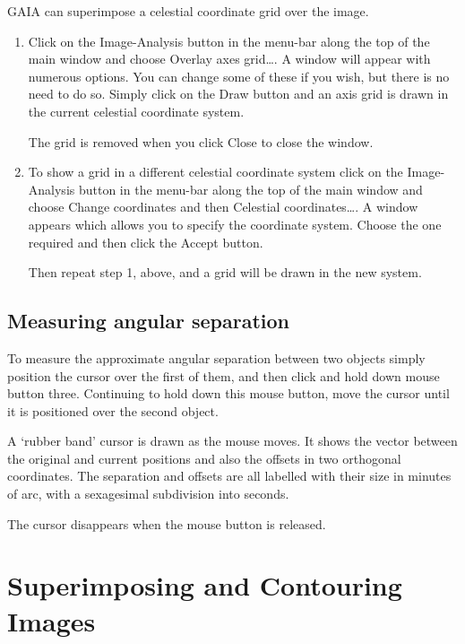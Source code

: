 \documentclass[twoside,11pt]{article}
\newcommand{\xlabel}[1]{}
\begin{document}
GAIA can superimpose a celestial coordinate grid over the image.

\begin{enumerate}

  \item Click on the {\sf Image-Analysis} button in the menu-bar along
   the top    of the main window and choose {\sf Overlay axes grid\ldots}.
   A window will appear with numerous options.  You can change some of
   these if you wish, but there is no need to do so.  Simply click on the
   {\sf Draw} button and an axis grid is drawn in the current celestial
   coordinate system.

   The grid is removed when you click {\sf Close} to close the window.

  \item To show a grid in a different celestial coordinate system click
   on the {\sf Image-Analysis} button in the menu-bar along the top
   of the main window and choose {\sf Change coordinates} and then
   {\sf Celestial coordinates\ldots}.  A window appears which allows you
   to specify the coordinate system.  Choose the one required and then
   click the {\sf Accept} button.

   Then repeat step 1, above, and a grid will be drawn in the new system.

\end{enumerate}

\subsection{Measuring angular separation}

To measure the approximate angular separation between two objects simply
position the cursor over the first of them, and then click and hold down
mouse button three.  Continuing to hold down this mouse button, move the
cursor until it is positioned over the second object.

A `rubber band' cursor is drawn as the mouse moves.  It shows the vector
between the original and current positions and also the offsets in two
orthogonal coordinates.  The separation and offsets are all labelled with
their size in minutes of arc, with a sexagesimal subdivision into seconds.

The cursor disappears when the mouse button is released.


\newpage
\section{\xlabel{SUPER_RECIP}\label{SUPER_RECIP}Superimposing and
Contouring Images}
\end{document}

